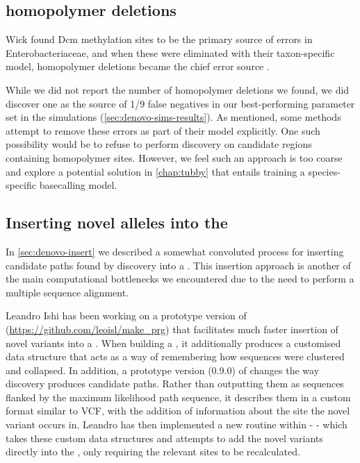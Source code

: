 \subsection{\ont{} homopolymer deletions}
Wick \etal{} found Dcm methylation sites to be the primary source of errors in Enterobacteriaceae, and when these were eliminated with their taxon-specific model, homopolymer deletions became the chief error source \cite{wick2019}. 

While we did not report the number of homopolymer deletions we found, we did discover one as the source of 1/9 false negatives in our best-performing parameter set in the simulations (\autoref{sec:denovo-sims-results}). As mentioned, some methods attempt to remove these errors as part of their model explicitly. One such possibility would be to refuse to perform \denovo{} discovery on candidate regions containing homopolymer sites. However, we feel such an approach is too coarse and explore a potential solution in \autoref{chap:tubby} that entails training a species-specific \ont{} basecalling model.  

\subsection{Inserting novel alleles into the \panrg{}}
\label{denovo-fw-insert}

In \autoref{sec:denovo-insert} we described a somewhat convoluted process for inserting candidate paths found by \denovo{} discovery into a \panrg{}. This insertion approach is another of the main computational bottlenecks we encountered due to the need to perform a multiple sequence alignment. 

Leandro Ishi has been working on a prototype version of \makeprg{} (\url{https://github.com/leoisl/make_prg}) that facilitates much faster insertion of novel variants into a \panrg{}. When building a \prg{}, it additionally produces a customised data structure that acts as a way of remembering how sequences were clustered and collapsed. In addition, a prototype version (0.9.0) of \pandora{} changes the way \denovo{} discovery produces candidate paths. Rather than outputting them as sequences flanked by the maximum likelihood path sequence, it describes them in a custom format similar to VCF, with the addition of information about the \prg{} site the novel variant occurs in. Leandro has then implemented a new routine within \makeprg{} -  - which takes these custom data structures and attempts to add the novel variants directly into the \prg{}, only requiring the relevant sites to be recalculated. 

